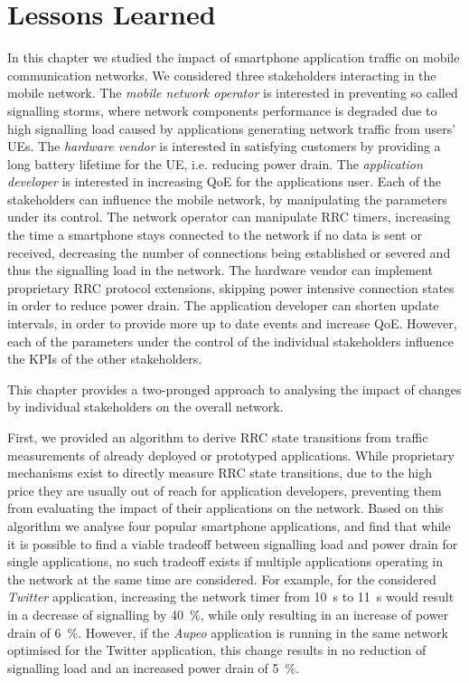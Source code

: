 \section{Lessons Learned}\label{sec:network:lessons_learned}
In this chapter we studied the impact of smartphone application traffic on mobile communication networks.
We considered three stakeholders interacting in the mobile network.
The \emph{mobile network operator} is interested in preventing so called signalling storms, where network components performance is degraded due to high signalling load caused by applications generating network traffic from users' \glspl{UE}.
The \emph{hardware vendor} is interested in satisfying customers by providing a long battery lifetime for the \gls{UE}, i.e. reducing power drain.
The \emph{application developer} is interested in increasing \gls{QoE} for the applications user.
Each of the stakeholders can influence the mobile network, by manipulating the parameters under its control.
The network operator can manipulate \gls{RRC} timers, increasing the time a smartphone stays connected to the network if no data is sent or received, decreasing the number of connections being established or severed and thus the signalling load in the network.
The hardware vendor can implement proprietary \gls{RRC} protocol extensions, skipping power intensive connection states in order to reduce power drain.
The application developer can shorten update intervals, in order to provide more up to date events and increase \gls{QoE}.
However, each of the parameters under the control of the individual stakeholders influence the \glspl{KPI} of the other stakeholders.

This chapter provides a two-pronged approach to analysing the impact of changes by individual stakeholders on the overall network.

First, we provided an algorithm to derive \gls{RRC} state transitions from traffic measurements of already deployed or prototyped applications.
While proprietary mechanisms exist to directly measure \gls{RRC} state transitions, due to the high price they are usually out of reach for application developers, preventing them from evaluating the impact of their applications on the network.
Based on this algorithm we analyse four popular smartphone applications, and find that while it is possible to find a viable tradeoff between signalling load and power drain for single applications, no such tradeoff exists if multiple applications operating in the network at the same time are considered.
For example, for the considered \emph{Twitter} application, increasing the network timer \TDCH from \SI{10}{\second} to \SI{11}{\second} would result in a decrease of signalling by \SI{40}{\percent}, while only resulting in an increase of power drain of \SI{6}{\percent}.
However, if the \emph{Aupeo} application is running in the same network optimised for the Twitter application, this change results in no reduction of signalling load and an increased power drain of \SI{5}{\percent}.

